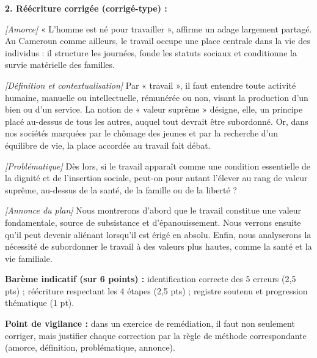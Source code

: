 \documentclass[11pt]{article}
\begin{document}
\begin{corrige}
\textbf{2. Réécriture corrigée (corrigé-type) :}

\emph{[Amorce]} « L'homme est né pour travailler », affirme un adage largement partagé. Au Cameroun comme ailleurs, le travail occupe une place centrale dans la vie des individus : il structure les journées, fonde les statuts sociaux et conditionne la survie matérielle des familles.

\emph{[Définition et contextualisation]} Par « travail », il faut entendre toute activité humaine, manuelle ou intellectuelle, rémunérée ou non, visant la production d'un bien ou d'un service. La notion de « valeur suprême » désigne, elle, un principe placé au-dessus de tous les autres, auquel tout devrait être subordonné. Or, dans nos sociétés marquées par le chômage des jeunes et par la recherche d'un équilibre de vie, la place accordée au travail fait débat.

\emph{[Problématique]} Dès lors, si le travail apparaît comme une condition essentielle de la dignité et de l'insertion sociale, peut-on pour autant l'élever au rang de valeur suprême, au-dessus de la santé, de la famille ou de la liberté ?

\emph{[Annonce du plan]} Nous montrerons d'abord que le travail constitue une valeur fondamentale, source de subsistance et d'épanouissement. Nous verrons ensuite qu'il peut devenir aliénant lorsqu'il est érigé en absolu. Enfin, nous analyserons la nécessité de subordonner le travail à des valeurs plus hautes, comme la santé et la vie familiale.

\textbf{Barème indicatif (sur 6 points) :} identification correcte des 5 erreurs (2,5 pts) ; réécriture respectant les 4 étapes (2,5 pts) ; registre soutenu et progression thématique (1 pt).

\textbf{Point de vigilance :} dans un exercice de remédiation, il faut non seulement corriger, mais justifier chaque correction par la règle de méthode correspondante (amorce, définition, problématique, annonce).
\end{corrige}
\end{document}
